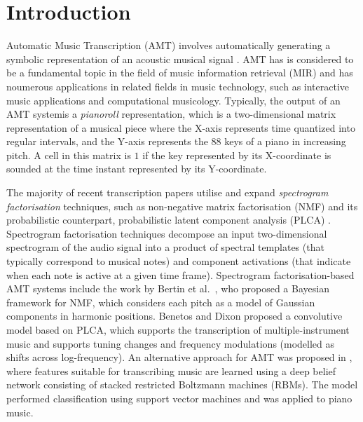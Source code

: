 \section{Introduction} 
\label{sec:introduction}

Automatic Music Transcription (AMT) involves automatically generating a symbolic representation of an acoustic musical signal \cite{Benetos2013b}. AMT has is considered to be a fundamental topic in the field of music information retrieval (MIR) and has noumerous applications in related fields in music technology, such as interactive music applications and computational musicology. Typically, the output of an AMT systemis a \textit{pianoroll} representation, which is a two-dimensional matrix representation of a musical piece where the X-axis represents time quantized into regular intervals, and the Y-axis represents the $88$ keys of a piano in increasing pitch. A cell in this matrix is $1$ if the key represented by its X-coordinate is sounded at the time instant represented by its Y-coordinate.

The majority of recent transcription papers utilise and expand \emph{spectrogram factorisation} techniques, such as non-negative matrix factorisation (NMF) \cite{Li1999} and its probabilistic counterpart, probabilistic latent component analysis (PLCA) \cite{Smaragdis2006}. Spectrogram factorisation techniques decompose an input two-dimensional spectrogram of the audio signal into a product of spectral templates (that typically correspond to musical notes) and component activations (that indicate when each note is active at a given time frame). Spectrogram factorisation-based AMT systems include the work by Bertin et al.\ \cite{Bertin2009}, who proposed a Bayesian framework for NMF, which considers each pitch as a model of Gaussian components in harmonic positions. Benetos and Dixon \cite{Benetos2012} proposed a convolutive model based on PLCA, which supports the transcription of multiple-instrument music and supports tuning changes and frequency modulations (modelled as shifts across log-frequency). An alternative approach for AMT was proposed in \cite{Nam2011}, where features suitable for transcribing music are learned using a deep belief network consisting of stacked restricted Boltzmann machines (RBMs). The model performed classification using support vector machines and was applied to piano music.

